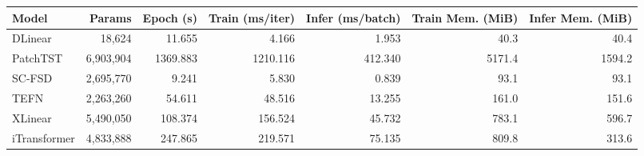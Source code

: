 \begin{tabular}{lrrrrrr}
\toprule
Model & Params & Epoch (s) & Train (ms/iter) & Infer (ms/batch) & Train Mem. (MiB) & Infer Mem. (MiB) \\
\midrule
DLinear & 18,624 & 11.655 & 4.166 & 1.953 & 40.3 & 40.4 \\
PatchTST & 6,903,904 & 1369.883 & 1210.116 & 412.340 & 5171.4 & 1594.2 \\
SC-FSD & 2,695,770 & 9.241 & 5.830 & 0.839 & 93.1 & 93.1 \\
TEFN & 2,263,260 & 54.611 & 48.516 & 13.255 & 161.0 & 151.6 \\
XLinear & 5,490,050 & 108.374 & 156.524 & 45.732 & 783.1 & 596.7 \\
iTransformer & 4,833,888 & 247.865 & 219.571 & 75.135 & 809.8 & 313.6 \\
\bottomrule
\end{tabular}
